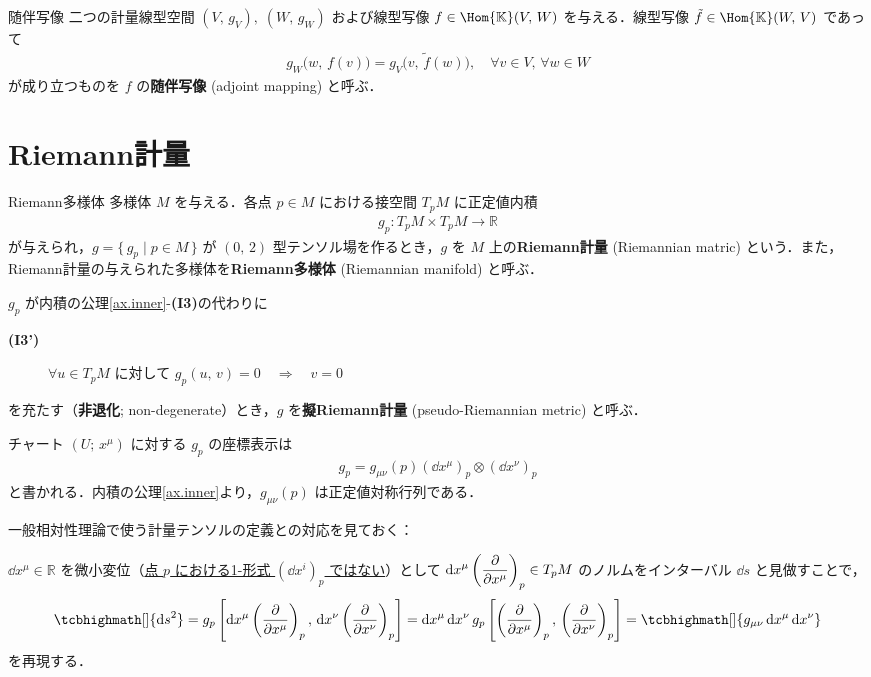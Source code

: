 \documentclass[geometry_main]{subfiles}
\begin{document}
\begin{mydef}[label=def.adj]{随伴写像}
	二つの計量線型空間 $(V,\, g_V),\; (W,\, g_W)$ および線型写像 $f \in \Hom{\mathbb{K}}(V,\, W)$ を与える．線型写像 $\tilde{f} \in \Hom{\mathbb{K}}(W,\, V)$ であって
	\begin{align} 
		g_W\bigl(w,\, f(v)\bigr) = g_V\bigl(v,\, \tilde{f}(w)\bigr),\quad \forall v \in V,\, \forall w \in W
	\end{align}
	が成り立つものを $f$ の\textbf{随伴写像} (adjoint mapping) と呼ぶ．
\end{mydef}

\section{Riemann計量}

\begin{mydef}[label=def.Riemann]{Riemann多様体}
	\cinfty 多様体 $M$ を与える．各点 $p \in M$ における接空間 $T_pM$ に正定値内積
	\begin{align} 
		g_p \colon T_p M \times T_pM \to \mathbb{R}
	\end{align}
	が与えられ，$g = \{\, g_p \mid p \in M\, \}$ が $(0,\, 2)$ 型テンソル場を作るとき，$g$ を $M$ 上の\textbf{Riemann計量} (Riemannian matric) という．また，Riemann計量の与えられた多様体を\textbf{Riemann多様体} (Riemannian manifold) と呼ぶ．
\end{mydef}

\begin{marker} 
	$g_p$ が内積の公理\ref{ax.inner}-\textbf{(I3)}の代わりに
	\begin{description} 
		\item[\textbf{(I3')}] $\forall u \in T_p M$ に対して $g_p(u,\, v) = 0\quad \Longrightarrow \quad v = 0$
	\end{description}
	を充たす（\textbf{非退化}; non-degenerate）とき，$g$ を\textbf{擬Riemann計量} (pseudo-Riemannian metric) と呼ぶ．
\end{marker}

チャート $(U;\, x^\mu)$ に対する $g_p$ の座標表示は
\begin{align} 
	g_p = g_{\mu\nu}(p) (\dd{x^\mu})_p \otimes (\dd{x^\nu})_p
\end{align}
と書かれる．内積の公理\ref{ax.inner}より，$g_{\mu\nu}(p)$ は正定値対称行列である．

一般相対性理論で使う計量テンソルの定義との対応を見ておく：

$\dd{x^\mu} \in \mathbb{R}$ を微小変位（\underline{点 $p$ における1-形式 $(\dd{x^i})_p$ ではない}）として $\displaystyle \dd{x^\mu} \left(\pdv{}{x^\mu}\right)_p \in T_p M$ のノルムをインターバル $\dd{s}$ と見做すことで，
\begin{align} 
	\tcbhighmath[]{\dd{s}^2} = g_p \left[ \dd{x^\mu} \left(\pdv{}{x^\mu}\right)_p,\, \dd{x^\nu} \left(\pdv{}{x^\nu}\right)_p \right] = \dd{x^\mu} \dd{x^\nu} g_p \left[ \left(\pdv{}{x^\mu}\right)_p,\, \left(\pdv{}{x^\nu}\right)_p \right] = \tcbhighmath[]{g_{\mu\nu} \dd{x^\mu} \dd{x^\nu}}
\end{align}
を再現する．
\end{document}
